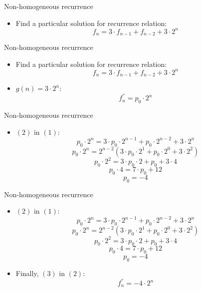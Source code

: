 \documentclass{beamer}
\begin{document}
\begin{frame}{Non-homogeneous recurrence}
   \begin{itemize}
        \item Find a particular solution for recurrence relation:
            \begin{equation}\tag{1}
                f_n = 3 \cdot f_{n-1} + f_{n-2} + 3 \cdot 2^n
            \end{equation}
      \end{itemize}
\end{frame}

\begin{frame}{Non-homogeneous recurrence}
   \begin{itemize}
        \item Find a particular solution for recurrence relation:
            \begin{equation}\tag{1}
                f_n = 3 \cdot f_{n-1} + f_{n-2} + 3 \cdot 2^n
            \end{equation}
        \item $g(n) = 3 \cdot 2^n$:
            \begin{equation}\tag{2}
                f_n^{''} = p_0 \cdot 2^n
            \end{equation}
      \end{itemize}
\end{frame}

\begin{frame}{Non-homogeneous recurrence}
   \begin{itemize}
        \item $(2)$ in $(1)$:
            $$ p_0 \cdot 2^n = 3 \cdot p_0 \cdot 2^{n-1} + p_0 \cdot 2^{n-2} + 3 \cdot 2^n $$
            $$ p_0 \cdot 2^n = 2^{n-2}( 3 \cdot p_0 \cdot 2^{1} + p_0 \cdot 2^{0} + 3 \cdot 2^2) $$
            $$ p_0 \cdot 2^2 = 3 \cdot p_0 \cdot 2 + p_0 + 3 \cdot 4 $$
            $$ p_0 \cdot 4 = 7 \cdot p_0 + 12 $$
            \begin{equation}\tag{3}
                p_0 = -4
            \end{equation}
      \end{itemize}
\end{frame}

\begin{frame}{Non-homogeneous recurrence}
   \begin{itemize}
        \item $(2)$ in $(1)$:
            $$ p_0 \cdot 2^n = 3 \cdot p_0 \cdot 2^{n-1} + p_0 \cdot 2^{n-2} + 3 \cdot 2^n $$
            $$ p_0 \cdot 2^n = 2^{n-2}( 3 \cdot p_0 \cdot 2^{1} + p_0 \cdot 2^{0} + 3 \cdot 2^2) $$
            $$ p_0 \cdot 2^2 = 3 \cdot p_0 \cdot 2 + p_0 + 3 \cdot 4 $$
            $$ p_0 \cdot 4 = 7 \cdot p_0 + 12 $$
            \begin{equation}\tag{3}
                p_0 = -4
            \end{equation}
        \item Finally, $(3)$ in $(2)$:
            $$ f_n^{''} = -4 \cdot 2^n $$
      \end{itemize}
\end{frame}
\end{document}

